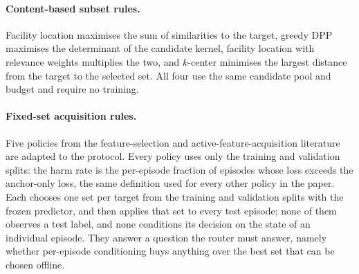 \documentclass[preprint,12pt]{elsarticle}
\begin{document}
\paragraph{Content-based subset rules.}
Facility location maximises the sum of similarities to the target, greedy DPP
maximises the determinant of the candidate kernel, facility location with
relevance weights multiplies the two, and $k$-center minimises the largest
distance from the target to the selected set. All four use the same candidate
pool and budget and require no training.

\paragraph{Fixed-set acquisition rules.}
Five policies from the feature-selection and active-feature-acquisition
literature are adapted to the protocol. Every policy uses only the training and
validation splits: the harm rate is the per-episode fraction of episodes whose
loss exceeds the anchor-only loss, the same definition used for every other
policy in the paper. Each chooses one set per target from
the training and validation splits with the frozen predictor, and then applies
that set to every test episode; none of them observes a test label, and none
conditions its decision on the state of an individual episode. They answer a
question the router must answer, namely whether per-episode conditioning buys
anything over the best set that can be chosen offline.
\end{document}
